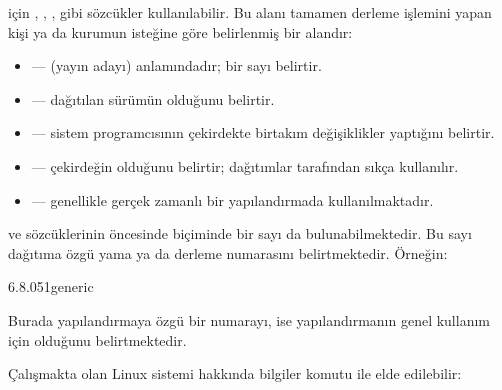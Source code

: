 \documentclass[a4paper,10pt,turkish]{sphinxmanual}
\begin{document}
\sphinxAtStartPar
{} için , , ,  gibi sözcükler kullanılabilir. Bu
 alanı tamamen derleme işlemini yapan kişi ya da kurumun isteğine göre belirlenmiş bir
alandır:
\begin{itemize}
\item {} 
\sphinxAtStartPar
{} —  (yayın adayı) anlamındadır;  bir sayı belirtir.

\item {} 
\sphinxAtStartPar
{} — dağıtılan sürümün  olduğunu belirtir.

\item {} 
\sphinxAtStartPar
{} — sistem programcısının çekirdekte birtakım değişiklikler yaptığını belirtir.

\item {} 
\sphinxAtStartPar
{} — çekirdeğin  olduğunu belirtir; dağıtımlar
tarafından sıkça kullanılır.

\item {} 
\sphinxAtStartPar
{} — genellikle gerçek zamanlı bir yapılandırmada kullanılmaktadır.

\end{itemize}

\sphinxAtStartPar
{} ve  sözcüklerinin öncesinde  biçiminde bir sayı da bulunabilmektedir. Bu
sayı dağıtıma özgü yama ya da derleme numarasını belirtmektedir. Örneğin:

\begin{sphinxVerbatim}[commandchars=\\\{\}]
6.8.0\PYGZhy{}51\PYGZhy{}generic
\end{sphinxVerbatim}

\sphinxAtStartPar
Burada  yapılandırmaya özgü bir numarayı,  ise yapılandırmanın genel kullanım için
olduğunu belirtmektedir.

\sphinxAtStartPar
Çalışmakta olan Linux sistemi hakkında bilgiler  komutu ile elde edilebilir:
\end{document}
